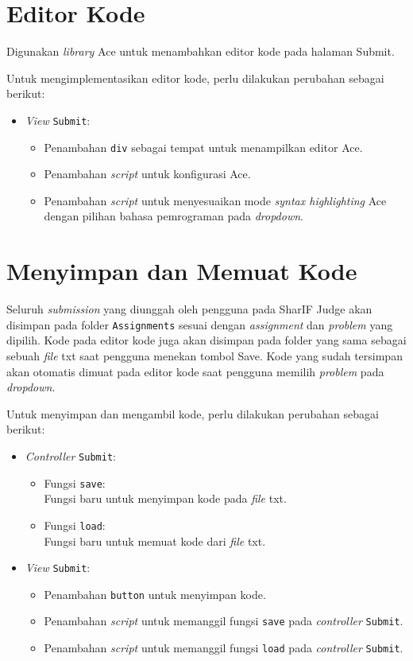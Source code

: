 \section{Editor Kode}
\label{sec:4:editor}

Digunakan \textit{library} Ace untuk menambahkan editor kode pada halaman Submit.

Untuk mengimplementasikan editor kode, perlu dilakukan perubahan sebagai berikut:
\begin{itemize}
    \item \textit{View} \verb|Submit|:
    \begin{itemize}
        \item Penambahan \verb|div| sebagai tempat untuk menampilkan editor Ace.
        \item Penambahan \textit{script} untuk konfigurasi Ace.
        \item Penambahan \textit{script} untuk menyesuaikan mode \textit{syntax highlighting} Ace dengan pilihan bahasa pemrograman pada \textit{dropdown}.
    \end{itemize}
\end{itemize}

\section{Menyimpan dan Memuat Kode}
\label{sec:4:simpan}

Seluruh \textit{submission} yang diunggah oleh pengguna pada SharIF Judge akan disimpan pada folder \verb|Assignments| sesuai dengan \textit{assignment} dan \textit{problem} yang dipilih. Kode pada editor kode juga akan disimpan pada folder yang sama sebagai sebuah \textit{file} txt saat pengguna menekan tombol Save. Kode yang sudah tersimpan akan otomatis dimuat pada editor kode saat pengguna memilih \textit{problem} pada \textit{dropdown}.

Untuk menyimpan dan mengambil kode, perlu dilakukan perubahan sebagai berikut:
\begin{itemize}
	\item \textit{Controller} \verb|Submit|:
    \begin{itemize}
		\item Fungsi \verb|save|: \\ Fungsi baru untuk menyimpan kode pada \textit{file} txt.
		\item Fungsi \verb|load|: \\ Fungsi baru untuk memuat kode dari \textit{file} txt.
    \end{itemize}
    \item \textit{View} \verb|Submit|:
    \begin{itemize}
        \item Penambahan \verb|button| untuk menyimpan kode.
        \item Penambahan \textit{script} untuk memanggil fungsi \verb|save| pada \textit{controller} \verb|Submit|. 
        \item Penambahan \textit{script} untuk memanggil fungsi \verb|load| pada \textit{controller} \verb|Submit|. 
    \end{itemize}
\end{itemize}

